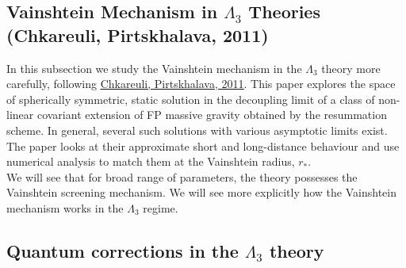 \documentclass{book}
\theoremstyle{definition}
\begin{document}
\newpage


\subsection{Vainshtein Mechanism in $\Lambda_3$ Theories (Chkareuli, Pirtskhalava, 2011)}

In this subsection we study the Vainshtein mechanism in the $\Lambda_3$ theory more carefully, following \href{https://arxiv.org/pdf/1105.1783.pdf}{\underline{Chkareuli, Pirtskhalava, 2011}}. This paper explores the space of spherically symmetric, static solution in the decoupling limit of a class of non-linear covariant extension of FP massive gravity obtained by the resummation scheme. In general, several such
solutions with various asymptotic limits exist. The paper looks at their approximate
short and long-distance behaviour and use numerical analysis to match them at the Vainshtein radius, $r_*$. \\

We will see that for  broad range of parameters, the theory possesses the Vainshtein screening mechanism. We will see more explicitly how the Vainshtein mechanism works in the $\Lambda_3$ regime. 






\newpage

\subsection{Quantum corrections in the $\Lambda_3$ theory}



\newpage































   
\end{document}
